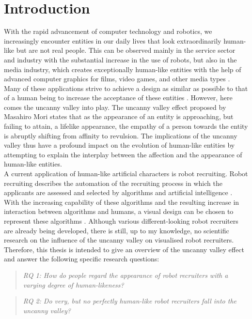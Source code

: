 \chapter{Introduction}
With the rapid advancement of computer technology and robotics, we increasingly encounter entities in our daily lives that look extraordinarily human-like but are not real people. This can be observed mainly in the service sector and industry with the substantial increase in the use of robots, but also in the media industry, which creates exceptionally human-like entities with the help of advanced computer graphics for films, video games, and other media types \cite{original_masahiro}. Many of these applications strive to achieve a design as similar as possible to that of a human being to increase the acceptance of these entities \cite{original_masahiro}. However, here comes the uncanny valley into play. The uncanny valley effect proposed by Masahiro Mori \cite{original_masahiro} states that as the appearance of an entity is approaching, but failing to attain, a lifelike appearance, the empathy of a person towards the entity is abruptly shifting from affinity to revulsion. The implications of the uncanny valley thus have a profound impact on the evolution of human-like entities by attempting to explain the interplay between the affection and the appearance of human-like entities.\\
A current application of human-like artificial characters is robot recruiting. Robot recruiting describes the automation of the recruiting process in which the applicants are assessed and selected by algorithms and artificial intelligence \cite{robot_recruiting_scholar}. With the increasing capability of these algorithms and the resulting increase in interaction between algorithms and humans, a visual design can be chosen to represent these algorithms \cite{robot_recruiting_scholar}.
Although various different-looking robot recruiters are already being developed, there is still, up to my knowledge, no scientific research on the influence of the uncanny valley on visualised robot recruiters.\newpage
Therefore, this thesis is intended to give an overview of the uncanny valley effect and answer the following specific research questions:

\begin{quote}\emph{RQ 1: How do people regard the appearance of robot recruiters with a varying degree of human-likeness?}\end{quote} 

\begin{quote}\emph{RQ 2: Do very, but no perfectly human-like robot recruiters fall into the uncanny valley?}\end{quote} 

